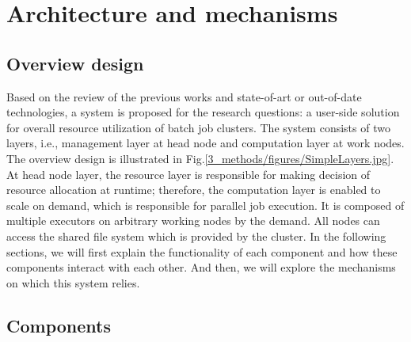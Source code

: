
\chapter{Architecture and mechanisms}\label{chapter:4} %



\ifpdf
    \graphicspath{{3_methods/figures/PNG/}{3_methods/figures/PDF/}{3_methods/figures/}}
\else
    \graphicspath{{3_methods/figures/EPS/}{3_methods/figures/}}
\fi


% 





\section{Overview design}
Based on the review of the previous works and state-of-art or out-of-date technologies, a system is proposed for the research questions: a user-side solution for overall resource utilization of batch job clusters.
The system consists of two layers, i.e.,  management layer at head node and computation layer at work nodes. The overview design is illustrated in Fig.\ref{3_methods/figures/SimpleLayers.jpg}. 
At head node layer, the resource layer is responsible for making decision of resource allocation at runtime; 
therefore, the computation layer is enabled to scale on demand, which is responsible for parallel job execution. 
It is composed of multiple executors on arbitrary working nodes by the demand. 
All nodes can access the shared file system which is provided by the cluster. 
In the following sections, we will first explain the functionality of each component and how these components interact with each other. 
And then, we will explore the mechanisms on which this system relies.



\section{Components}
